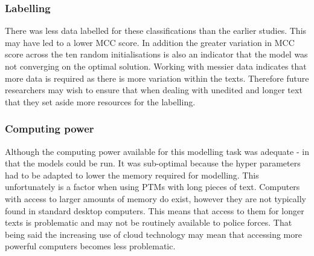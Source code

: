 \subsubsection{Labelling} There was less data labelled for these classifications than the earlier studies. This may have led to a lower MCC score. In addition the greater variation in MCC score across the ten random initialisations is also an indicator that the model was not converging on the optimal solution. Working with messier data indicates that more data is required as there is more variation within the texts. Therefore future researchers may wish to ensure that when dealing with unedited and longer text that they set aside more resources for the labelling.

\subsubsection{Computing power}Although the computing power available for this modelling task was adequate - in that the models could be run. It was  sub-optimal because the hyper parameters had to be adapted to lower the memory required for modelling. This unfortunately is a factor when using PTMs with long pieces of text. Computers with access to larger amounts of memory do exist, however they are not typically found in standard desktop computers. This means that access to them for longer texts is problematic and may not be routinely available to police forces. That being said the increasing use of cloud technology may mean that accessing more powerful computers becomes less problematic.

 
